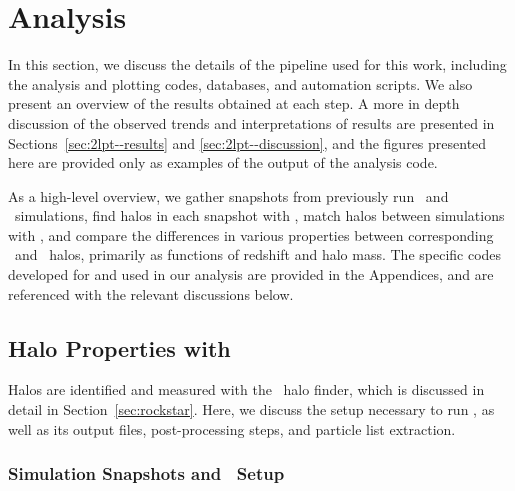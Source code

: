 
%
%

\section{Analysis}
\label{sec:analysis}



In this section, we discuss the details of the pipeline used for this work, including the analysis and plotting codes, databases, and automation scripts.  We also present an overview of the results obtained at each step.  A more in depth discussion of the observed trends and interpretations of results are presented in Sections~\ref{sec:2lpt--results} and \ref{sec:2lpt--discussion}, and the figures presented here are provided only as examples of the output of the analysis code.

As a high-level overview, we gather snapshots from previously run \lpt\ and \za\ simulations, find halos in each snapshot with \rockstar, match halos between simulations with \crossmatch, and compare the differences in various properties between corresponding \lpt\ and \za\ halos, primarily as functions of redshift and halo mass.  The specific codes developed for and used in our analysis are provided in the Appendices, and are referenced with the relevant discussions below.




\subsection{Halo Properties with \rockstar}
\label{subsec:analysis--halo_properties}


Halos are identified and measured with the \rockstar\ halo finder, which is discussed in detail in Section~\ref{sec:rockstar}.  Here, we discuss the setup necessary to run \rockstar, as well as its output files, post-processing steps, and particle list extraction.



\subsubsection{Simulation Snapshots and \rockstar\ Setup}
\label{subsubsec:analysis--halo_properties--setup}


